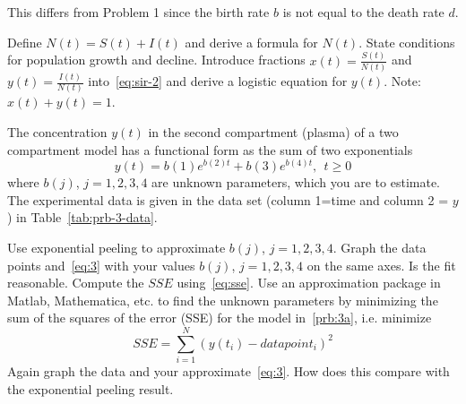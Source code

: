 \documentclass[
    number={9},
    title={Epidemics}
]{math486homework}
\begin{document}
\begin{problems}
    This differs from Problem 1 since the birth rate $b$ is not equal to the death rate $d$.
    \begin{problems}
        \subproblem Define $N(t) = S(t) + I(t)$ and derive a formula for $N(t)$.
        State conditions for population growth and decline. 
        \subproblem Introduce fractions $x(t) = \frac{S(t)}{N(t)}$ and $y(t) = \frac{I(t)}{N(t)}$ into~\eqref{eq:sir-2} and derive a logistic equation for $y(t)$.
        Note: $x(t) + y(t) = 1$. 
    \end{problems}
    \problem The concentration $y(t)$ in the second compartment (plasma) of a two compartment model has a functional form as the sum of two exponentials
    \begin{equation}
    	y(t) = b(1)e^{b(2)t} + b(3)e^{b(4)t},\ \ t \geq 0
    	\label{eq:3}
    \end{equation}
    where $b(j)$, $j=1, 2, 3, 4$ are unknown parameters, which you are to estimate.
    The experimental data is given in the data set (column 1=time and column 2 = $y$) in Table~\ref{tab:prb-3-data}.
    \begin{problems}
        \subproblem Use exponential peeling to approximate $b(j)$, $j=1, 2, 3, 4$. 
        \subproblem Graph the data points and~\eqref{eq:3} with your values $b(j)$, $j=1, 2, 3, 4$ on the same axes.
        Is the fit reasonable.
        Compute the $SSE$ using~\eqref{eq:sse}. 
        \subproblem Use an approximation package in Matlab, Mathematica, etc. to find the unknown parameters by minimizing the sum of the squares of the error (SSE) for the model in~\ref{prb:3a}, i.e. minimize
        \begin{equation}
        	SSE = \sum_{i=1}^{N} \left( y(t_{i}) - datapoint_{i} \right)^{2}
        	\label{eq:sse}
        \end{equation}
        Again graph the data and your approximate~\eqref{eq:3}.
        How does this compare with the exponential peeling result. 
    \end{problems}
\end{problems}
\end{document}
